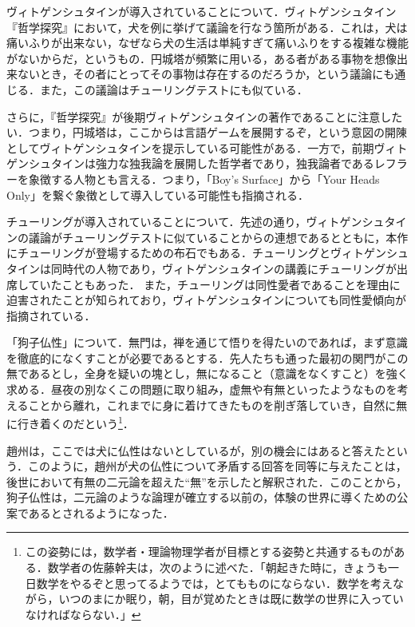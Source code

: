 \documentclass[10pt, a5paper, twoside]{ltjsarticle}
\begin{document}
            ヴィトゲンシュタインが導入されていることについて．ヴィトゲンシュタイン『哲学探究』において，犬を例に挙げて議論を行なう箇所がある．これは，犬は痛いふりが出来ない，なぜなら犬の生活は単純すぎて痛いふりをする複雑な機能がないからだ，というもの．円城塔が頻繁に用いる，ある者がある事物を想像出来ないとき，その者にとってその事物は存在するのだろうか，という議論にも通じる．また，この議論はチューリングテストにも似ている．

            さらに，『哲学探究』が後期ヴィトゲンシュタインの著作であることに注意したい．つまり，円城塔は，ここからは言語ゲームを展開するぞ，という意図の開陳としてヴィトゲンシュタインを提示している可能性がある．一方で，前期ヴィトゲンシュタインは強力な独我論を展開した哲学者であり，独我論者であるレフラーを象徴する人物とも言える．つまり，「Boy's Surface」から「Your Heads Only」を繋ぐ象徴として導入している可能性も指摘される．

            チューリングが導入されていることについて．先述の通り，ヴィトゲンシュタインの議論がチューリングテストに似ていることからの連想であるとともに，本作にチューリングが登場するための布石でもある．チューリングとヴィトゲンシュタインは同時代の人物であり，ヴィトゲンシュタインの講義にチューリングが出席していたこともあった．%
            また，チューリングは同性愛者であることを理由に迫害されたことが知られており，ヴィトゲンシュタインについても同性愛傾向が指摘されている．

            「狗子仏性」について．無門は，禅を通じて悟りを得たいのであれば，まず意識を徹底的になくすことが必要であるとする．先人たちも通った最初の関門がこの無であるとし，全身を疑いの塊とし，無になること（意識をなくすこと）を強く求める．昼夜の別なくこの問題に取り組み，虚無や有無といったようなものを考えることから離れ，これまでに身に着けてきたものを削ぎ落していき，自然に無に行き着くのだという\footnote{この姿勢には，数学者・理論物理学者が目標とする姿勢と共通するものがある．数学者の佐藤幹夫は，次のように述べた．「朝起きた時に，きょうも一日数学をやるぞと思ってるようでは，とてもものにならない．数学を考えながら，いつのまにか眠り，朝，目が覚めたときは既に数学の世界に入っていなければならない．」\cite{kimura}}\cite{mumonkan}．

            趙州は，ここでは犬に仏性はないとしているが，別の機会にはあると答えたという．このように，趙州が犬の仏性について矛盾する回答を同等に与えたことは，後世において有無の二元論を超えた“無”を示したと解釈された．このことから，狗子仏性は，二元論のような論理が確立する以前の，体験の世界に導くための公案であるとされるようになった\cite{mumonkan}．
\end{document}

